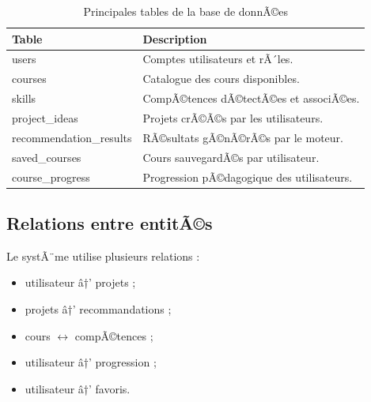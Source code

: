 ﻿\documentclass[12pt,a4paper]{report}
\begin{document}
\begin{table}[H]
    \centering
    \caption{Principales tables de la base de donnÃ©es}

    \begin{tabular}{|p{4cm}|p{9cm}|}
        \hline
        \textbf{Table} & \textbf{Description} \\
        \hline

        users &
        Comptes utilisateurs et rÃ´les. \\
        
        \hline

        courses &
        Catalogue des cours disponibles. \\
        
        \hline

        skills &
        CompÃ©tences dÃ©tectÃ©es et associÃ©es. \\
        
        \hline

        project\_ideas &
        Projets crÃ©Ã©s par les utilisateurs. \\
        
        \hline

        recommendation\_results &
        RÃ©sultats gÃ©nÃ©rÃ©s par le moteur. \\
        
        \hline

        saved\_courses &
        Cours sauvegardÃ©s par utilisateur. \\
        
        \hline

        course\_progress &
        Progression pÃ©dagogique des utilisateurs. \\
        
        \hline
    \end{tabular}
\end{table}

\subsection{Relations entre entitÃ©s}

Le systÃ¨me utilise plusieurs relations :
\begin{itemize}
    \item utilisateur â†’ projets ;
    \item projets â†’ recommandations ;
    \item cours $\leftrightarrow$ compÃ©tences ;
    \item utilisateur â†’ progression ;
    \item utilisateur â†’ favoris.
\end{itemize}
\end{document}
